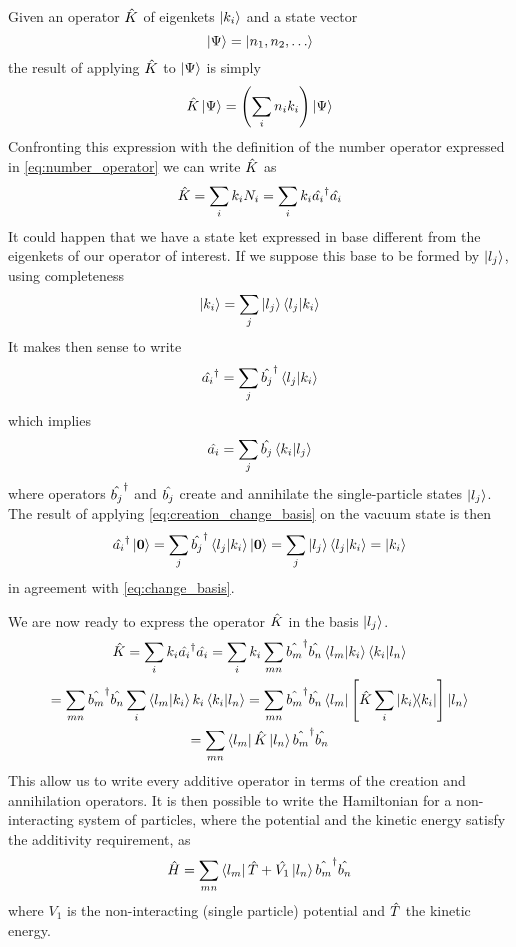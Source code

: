 Given an operator $\hat{K}$ of eigenkets $\ket{k_i}$ and a state vector
\begin{equation}
    \ket{\Psi} = \ket{n_1, n_2, \dots}
\end{equation}
the result of applying $\hat{K}$ to $\ket{\Psi}$ is simply
\begin{equation}
    \hat{K}\ket{\Psi} = \left( \sum_i n_i k_i \right) \ket{\Psi}
\end{equation}
Confronting this expression with the definition of the number operator expressed in \cref{eq:number_operator} we can write $\hat{K}$ as
\begin{equation}
    \hat{K} = \sum_i k_i N_i = \sum_i k_i  \hat{a_i}^\dagger\hat{a_i}
\end{equation}
It could happen that we have a state ket expressed in base different from the eigenkets of our operator of interest. If we suppose this base to be formed by $\ket{l_j}$, using completeness
\begin{equation} \label{eq:change_basis}
    \ket{k_i} = \sum_j \ket{l_j} \braket{l_j}{k_i}
\end{equation}
It makes then sense to write
\begin{equation} \label{eq:creation_change_basis}
    \hat{a_i}^\dagger = \sum_j \hat{b_j}^\dagger \braket{l_j}{k_i}
\end{equation}
which implies
\begin{equation}
    \hat{a_i} = \sum_j \hat{b_j} \braket{k_i}{l_j}
\end{equation}
where operators $\hat{b_j}^\dagger$ and $\hat{b_j}$ create and annihilate the single-particle states $\ket{l_j}$. The result of applying \cref{eq:creation_change_basis} on the vacuum state is then
\begin{equation}
    \hat{a_i}^\dagger \ket{\mathbf{\boldsymbol{0}}} = \sum_j \hat{b_j}^\dagger \braket{l_j}{k_i} \ket{\mathbf{\boldsymbol{0}}} = \sum_j \ket{l_j} \braket{l_j}{k_i} = \ket{k_i}
\end{equation}
in agreement with \cref{eq:change_basis}.

We are now ready to express the operator $\hat{K}$ in the basis $\ket{l_j}$.
\begin{multline}
    \hat{K} =  \sum_i k_i  \hat{a_i}^\dagger\hat{a_i}
    = \sum_i k_i \sum_{mn} \hat{b_m}^\dagger\hat{b_n} \braket{l_m}{k_i}\braket{k_i}{l_n}
    \\ = \sum_{mn} \hat{b_m}^\dagger\hat{b_n} \sum_i \braket{l_m}{k_i} k_i \braket{k_i}{l_n}
    = \sum_{mn} \hat{b_m}^\dagger\hat{b_n} \bra{l_m} \left[ \hat{K} \sum_i \op{k_i} \right] \ket{l_n}
    \\= \sum_{mn}  \bra{l_m}\hat{K}\ket{l_n} \hat{b_m}^\dagger\hat{b_n}
\end{multline}
This allow us to write every additive operator in terms of the creation and annihilation operators. It is then possible to write the Hamiltonian for a non-interacting system of particles, where the potential and the kinetic energy satisfy the additivity requirement, as
\begin{equation} \label{eq:second_quantization}
    \hat{H} = \sum_{mn} \bra{l_m}\hat{T}+\hat{V_1}\ket{l_n} \hat{b_m}^\dagger\hat{b_n}
\end{equation}
where $V_1$ is the non-interacting (single particle) potential and $\hat{T}$ the kinetic energy.